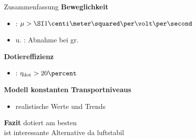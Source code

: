 \begin{frame}{Zusammenfassung}{}
{\bfseries Beweglichkeit}\par
\begin{itemize}
\item \CrPd : $\mob>\cmVs{1}$
\item \CrPd u. \WPd: Abnahme bei gr. \C 
\end{itemize}

\vspace*{1ex}
{\bfseries Dotiereffizienz}\par
\begin{itemize}
\item \CrPd : $\DopEff>20\percent$
\end{itemize}

\vspace*{1ex}
{\bfseries Modell konstanten Transportniveaus}\par
\begin{itemize}
\item realistische Werte und Trends
\end{itemize}

\vspace*{1ex}
\begin{block}
{\bfseries Fazit}
\CrPd dotiert \CS am besten
\\\dmbi ist interessante Alternative da luftstabil
\end{block}
\end{frame}
% 


